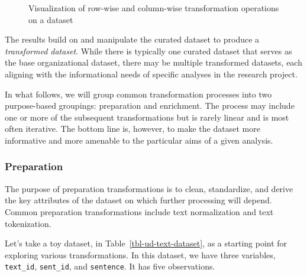 \documentclass[
  letterpaper,
]{latex/krantz}
\theoremstyle{definition}
\theoremstyle{remark}
\begin{document}
\begin{figure}[H]


\caption{\label{fig-ud-transformations}Visualization of row-wise and
column-wise transformation operations on a dataset}

\end{figure}%

The results build on and manipulate the curated dataset to produce a
\emph{transformed dataset}. While there is typically one curated dataset
that serves as the base organizational dataset, there may be multiple
transformed datasets, each aligning with the informational needs of
specific analyses in the research project.

In what follows, we will group common transformation processes into two
purpose-based groupings: preparation and enrichment. The process may
include one or more of the subsequent transformations but is rarely
linear and is most often iterative. The bottom line is, however, to make
the dataset more informative and more amenable to the particular aims of
a given analysis.

\subsubsection{Preparation}\label{preparation}

The purpose of preparation transformations is to clean, standardize, and
derive the key attributes of the dataset on which further processing
will depend. Common preparation transformations include text
normalization and text tokenization.

Let's take a toy dataset, in Table~\ref{tbl-ud-text-dataset}, as a
starting point for exploring various transformations. In this dataset,
we have three variables, \texttt{text\_id}, \texttt{sent\_id}, and
\texttt{sentence}. It has five observations.
\end{document}
